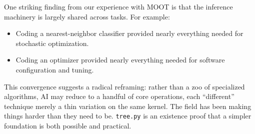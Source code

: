 \documentclass[AMA,STIX2COL]{WileyNJDv5}
\begin{document}
One striking finding from our experience with MOOT is
that the inference machinery is largely shared across
tasks. For example:
\begin{itemize}
\item Coding a nearest-neighbor classifier provided nearly
  everything needed for stochastic optimization.
\item Coding an optimizer provided nearly everything needed
  for software configuration and tuning.
\end{itemize}
This convergence suggests a radical reframing: rather than
a zoo of specialized algorithms, AI may reduce to a
handful of core operations, each ``different'' technique
merely a thin variation on the same kernel. The field has
been making things harder than they need to be.
\texttt{tree.py} is an existence proof that a simpler
foundation is both possible and practical.


\end{document}
